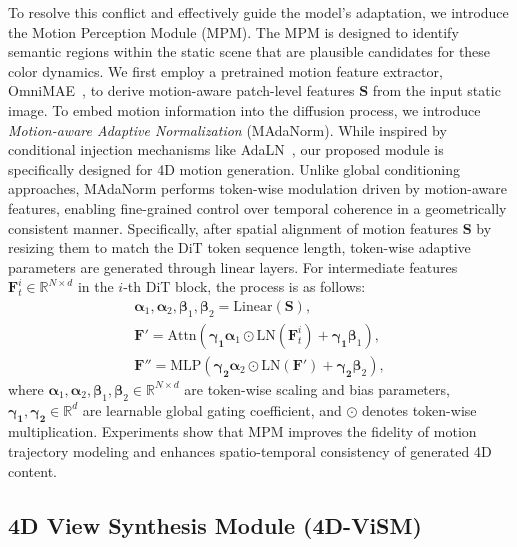 To resolve this conflict and effectively guide the model's adaptation, we introduce the Motion Perception Module (MPM). The MPM is designed to identify semantic regions within the static scene that are plausible candidates for these color dynamics. We first employ a pretrained motion feature extractor, OmniMAE~\cite{omnimae}, to derive motion-aware patch-level features $\mathbf{S}$ from the input static image. To embed motion information into the diffusion process, we introduce \textit{Motion-aware Adaptive Normalization} (MAdaNorm). While inspired by conditional injection mechanisms like AdaLN~\cite{dit}, our proposed module is specifically designed for 4D motion generation. Unlike global conditioning approaches, MAdaNorm performs token-wise modulation driven by motion-aware features, enabling fine-grained control over temporal coherence in a geometrically consistent manner. Specifically, after spatial alignment of motion features $\mathbf{S}$ by resizing them to match the DiT token sequence length, token-wise adaptive parameters are generated through linear layers. For intermediate features $\mathbf{F}^i_t \in \mathbb{R}^{N \times d}$ in the $i$-th DiT block, the process is as follows:
\begin{gather}
\boldsymbol{\alpha}_1, \boldsymbol{\alpha}_2, \boldsymbol{\beta}_1, \boldsymbol{\beta}_2 = \text{Linear}(\mathbf{S}),\\
\mathbf{F}' = \text{Attn}\left( \boldsymbol{\gamma_1}\boldsymbol{\alpha}_1 \odot \text{LN}(\mathbf{F}^i_t) + \boldsymbol{\gamma_1}\boldsymbol{\beta}_1 \right), \\
\mathbf{F}'' = \text{MLP}\left( \boldsymbol{\gamma_2}\boldsymbol{\alpha}_2 \odot \text{LN}(\mathbf{F}') + \boldsymbol{\gamma_2} \boldsymbol{\beta}_2 \right),
\end{gather}
where $\boldsymbol{\alpha}_1, \boldsymbol{\alpha}_2, \boldsymbol{\beta}_1, \boldsymbol{\beta}_2 \in \mathbb{R}^{N \times d}$ are token-wise scaling and bias parameters, $\boldsymbol{\gamma_1},\boldsymbol{\gamma_2} \in \mathbb{R}^{d}$ are learnable global gating coefficient, and $\odot$ denotes token-wise multiplication. Experiments show that MPM improves the fidelity of motion trajectory modeling and enhances spatio-temporal consistency of generated 4D content.




\subsection{\textbf{4D} \textbf{Vi}ew \textbf{S}ynthesis \textbf{M}odule (\textbf{4D-ViSM})}
\label{sec:4D-ViSM}

